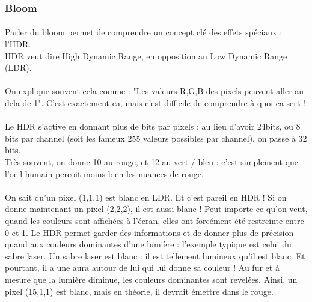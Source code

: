 \documentclass{EPUProjetDi}
\begin{document}

\subsubsection{Bloom} %


\paragraph{}
Parler du bloom permet de comprendre un concept clé des effets spéciaux : l'HDR.\\
HDR veut dire High Dynamic Range, en opposition au Low Dynamic Range (LDR).\\\\
On explique souvent cela comme : "Les valeurs R,G,B des pixels peuvent aller au dela de 1". C'est exactement ca, mais c'est difficile de comprendre à quoi ca sert ! \\\\
Le HDR s'active en donnant plus de bits par pixels : au lieu d'avoir 24bits, ou 8 bits par channel (soit les fameux 255 valeurs possibles par channel), on passe à 32 bits.\\
Très souvent, on donne 10 au rouge, et 12 au vert / bleu : c'est simplement que l'oeil humain percoit moins bien les nuances de rouge.

\paragraph{}
On sait qu'un pixel (1,1,1) est blanc en LDR.  Et c'est pareil en HDR ! Si on donne maintenant un pixel (2,2,2), il est aussi blanc !
Peut importe ce qu'on veut, quand les couleurs sont affichées à l'écran, elles ont forcément été restreinte entre 0 et 1.
Le HDR permet garder des informations et de donner plus de précision quand aux couleurs dominantes d'une lumière : l'exemple typique est celui du sabre laser.
Un sabre laser est blanc : il est tellement lumineux qu'il est blanc. Et pourtant, il a une aura autour de lui qui lui donne sa couleur ! Au fur et à mesure que la lumière diminue, les couleurs dominantes sont revelées.
Ainsi, un pixel (15,1,1) est blanc, mais en théorie, il devrait émettre dans le rouge.
\end{document}
